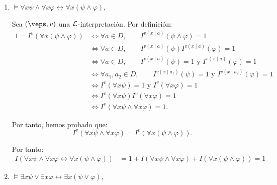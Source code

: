 \begin{ejercicio}
\begin{enumerate}
        Por tanto, hemos probado que:
        \begin{equation*}
            I^v(\exists x \psi \vee \varphi) = I^v(\exists x(\psi \vee \varphi)).
        \end{equation*}

        Por tanto:
        \begin{align*}
            I( \exists x \psi \vee \varphi \leftrightarrow \exists x(\psi \vee \varphi))
            &= 1+I(\exists x \psi \vee \varphi)+I(\exists x(\psi \vee \varphi))=1
        \end{align*}
        \item $\models \forall x \psi \wedge \forall x \varphi \leftrightarrow \forall x(\psi \wedge \varphi)$,
        
        Sea $(\veps,v)$ una $\mathcal{L}$-interpretación. Por definición:
        \begin{align*}
            1 = I^v(\forall x(\psi \wedge \varphi))
            &\iff \forall a\in D,\qquad I^{v(x\mid a)}(\psi \wedge \varphi) = 1\\
            &\iff \forall a\in D,\qquad I^{v(x\mid a)}(\psi)I^{v(x\mid a)}(\varphi) = 1\\
            &\iff \forall a\in D,\qquad I^{v(x\mid a)}(\psi) = 1\text{ y }I^{v(x\mid a)}(\varphi) = 1\\
            &\iff \forall a_1,a_2\in D,\qquad I^{v(x\mid a_1)}(\psi) = 1\text{ y }I^{v(x\mid a_2)}(\varphi) = 1\\
            &\iff I^v(\forall x\psi)=1\text{ y }I^v(\forall x\varphi)=1\\
            &\iff I^v(\forall x\psi)I^v(\forall x\varphi)=1\\
            &\iff I^v(\forall x\psi\wedge\forall x\varphi)=1.
        \end{align*}

        Por tanto, hemos probado que:
        \begin{equation*}
            I^v(\forall x \psi \wedge \forall x \varphi) = I^v(\forall x(\psi \wedge \varphi)).
        \end{equation*}

        Por tanto:
        \begin{align*}
            I( \forall x \psi \wedge \forall x \varphi \leftrightarrow \forall x(\psi \wedge \varphi))
            &= 1+I(\forall x \psi \wedge \forall x \varphi)+I(\forall x(\psi \wedge \varphi))=1
        \end{align*}
        \item $\models \exists x \psi \vee \exists x \varphi \leftrightarrow \exists x(\psi \vee \varphi)$,
        

\end{enumerate}
\end{ejercicio}
